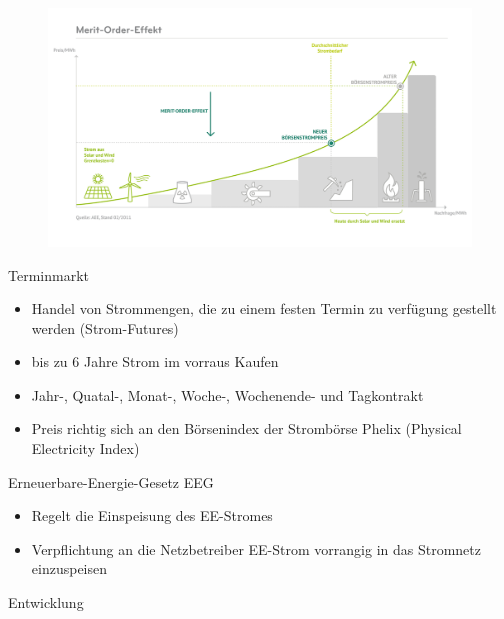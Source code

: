 \documentclass[aspectratio=1610, professionalfonts, 9pt]{beamer}
\begin{document}
{
\begin{frame}
  \begin{figure}
  \includegraphics[width=1\textwidth]{images/Merit.png}
\end{figure}
\end{frame}
}

\begin{frame}{Terminmarkt}
\begin{itemize}
  \item Handel von Strommengen, die zu einem festen Termin zu verfügung gestellt werden (Strom-Futures)
  \item bis zu 6 Jahre Strom im vorraus Kaufen
  \item Jahr-, Quatal-, Monat-, Woche-,  Wochenende- und Tagkontrakt
  \item Preis richtig sich an den Börsenindex der Strombörse Phelix (Physical Electricity Index)
\end{itemize}
\end{frame}

\begin{frame}{Erneuerbare-Energie-Gesetz EEG}
   \begin{itemize}
     \item Regelt die Einspeisung des EE-Stromes
     \item Verpflichtung an die Netzbetreiber EE-Strom vorrangig in das Stromnetz einzuspeisen 
   \end{itemize}
\end{frame}

\begin{frame}{Entwicklung}

\end{frame}
\end{document}
